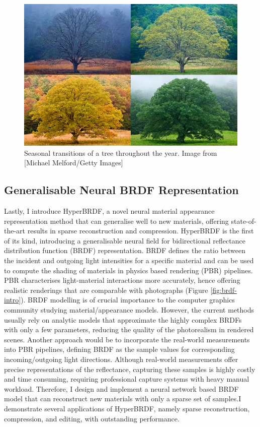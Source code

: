\begin{figure}[ht]
  \centering

    \includegraphics[width=0.75\linewidth]{Images/seasonchanges.png}

   \caption{Seasonal transitions of a tree throughout the year. Image from [Michael Melford/Getty Images]}
   \label{fig:colour-approximate}
\end{figure}

\subsection{Generalisable Neural BRDF Representation}
Lastly, I introduce HyperBRDF, a novel neural material appearance representation method that can generalise well to new materials, offering state-of-the-art results in sparse reconstruction and compression. HyperBRDF is the first of its kind, introducing a generalisable neural field for bidirectional reflectance distribution function (BRDF) representation. BRDF defines the ratio between the incident and outgoing light intensities for a specific material and can be used to compute the shading of materials in physics based rendering (PBR) pipelines. PBR characterises light-material interactions more accurately, hence offering realistic renderings that are comparable with photographs (Figure \ref{fig:brdf-intro}). BRDF modelling is of crucial importance to the computer graphics community studying material/appearance models. However, the current methods usually rely on analytic models that approximate the highly complex BRDFs with only a few parameters, reducing the quality of the photorealism in rendered scenes. Another approach would be to incorporate the real-world measurements into PBR pipelines, defining BRDF as the sample values for corresponding incoming/outgoing light directions. Although real-world measurements offer precise representations of the reflectance, capturing these samples is highly costly and time consuming, requiring professional capture systems with heavy manual workload. Therefore, I design and implement a neural network based BRDF model that can reconstruct new materials with only a sparse set of samples.I demonstrate several applications of HyperBRDF, namely sparse reconstruction, compression, and editing, with outstanding performance. 

